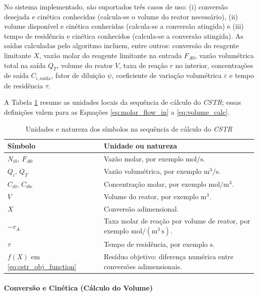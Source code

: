 No sistema implementado, são suportados três casos de uso: (i) conversão desejada e cinética conhecidas (calcula-se o volume do reator necessário), (ii) volume disponível e cinética conhecidas (calcula-se a conversão atingida) e (iii) tempo de residência e cinética conhecidos (calcula-se a conversão atingida). As saídas calculadas pelo algoritmo incluem, entre outros: conversão do reagente limitante $X$, vazão molar do reagente limitante na entrada $F_{A0}$, vazão volumétrica total na saída $Q_{T}$, volume do reator $V$, taxa de reação $r$ no interior, concentrações de saída $C_{i,\mathrm{saida}}$, fator de diluição $\psi$, coeficiente de variação volumétrica $\varepsilon$ e tempo de residência $\tau$.

A Tabela \ref{tab:unidades-cstr} resume as unidades locais da sequência de cálculo do \textit{CSTR}; essas definições valem para as Equações \ref{eq:molar_flow_in} a \ref{eq:volume_calc}.

\begin{table}[H]
    \centering
    \caption{Unidades e natureza dos símbolos na sequência de cálculo do \textit{CSTR}}
    \label{tab:unidades-cstr}
    \begin{tabular}{|p{}|p{}|}
        \hline
        \textbf{Símbolo} & \textbf{Unidade ou natureza} \\ \hline
        $N_{i0}$, $F_{A0}$ & Vazão molar, por exemplo $\mathrm{mol/s}$. \\ \hline
        $Q_i$, $Q_T$ & Vazão volumétrica, por exemplo $\mathrm{m^3/s}$. \\ \hline
        $C_{i0}$, $C_{i0e}$ & Concentração molar, por exemplo $\mathrm{mol/m^3}$. \\ \hline
        $V$ & Volume do reator, por exemplo $\mathrm{m^3}$. \\ \hline
        $X$ & Conversão adimensional. \\ \hline
        $-r_A$ & Taxa molar de reação por volume de reator, por exemplo $\mathrm{mol/(m^3\,s)}$. \\ \hline
        $\tau$ & Tempo de residência, por exemplo $\mathrm{s}$. \\ \hline
        $f(X)$ em \ref{eq:cstr_obj_function} & Resíduo objetivo: diferença numérica entre conversões adimensionais. \\ \hline
    \end{tabular}
\end{table}

\paragraph{Conversão e Cinética (Cálculo do Volume)}

